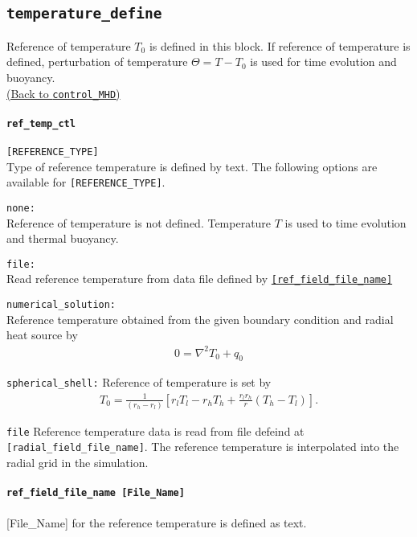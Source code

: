 \subsection{\tt temperature\_define}
\label{href_t:temperature_define}
Reference of temperature $T_{0}$ is defined in this block. If reference of temperature is defined, perturbation of temperature $\Theta = T - T_{0}$ is used for time evolution and buoyancy. \\
\hyperref[href_i:temperature_define]{(Back to {\tt control\_MHD})}

\paragraph{\tt ref\_temp\_ctl}
\label{href_t:ref_temp_ctl}
\verb|[REFERENCE_TYPE]| \\
Type of reference temperature is defined by text. The following options are available for \verb|[REFERENCE_TYPE]|.
%
\begin{description}
\item{\tt none: }   \\
Reference of temperature is not defined. Temperature $T$ is used to time evolution and thermal buoyancy.
\item{\tt file: }      \\
Read reference temperature from data file defined by \hyperref[href_t:ref_field_file_name]{\tt [ref\_field\_file\_name]}
\item{\tt numerical\_solution: } \\
Reference temperature obtained from the given boundary condition and radial heat source by
\begin{eqnarray}
 0 = \nabla^{2} T_{0} + q_{0}
 \nonumber
\end{eqnarray}
%

\item{\tt spherical\_shell:} Reference of temperature is set by
\begin{eqnarray}
 T_{0} = \frac{1}{\left(r_{h}-r_{l} \right)} \left[
          r_{l}T_{l} - r_{h}T_{h} + \frac{r_{l} r_{h}}{r} \left(T_{h}-T_{l}\right) \right].
\nonumber
\end{eqnarray}
\item{\tt file} Reference temperature data is read from file defeind at {\tt [radial\_field\_file\_name]}. The reference temperature is interpolated into the radial grid in the simulation.
\end{description}
%
\paragraph{\tt ref\_field\_file\_name [File\_Name]}
\label{href_t:ref_field_file_name}
 [File\_Name] for the reference temperature is defined as text. 

